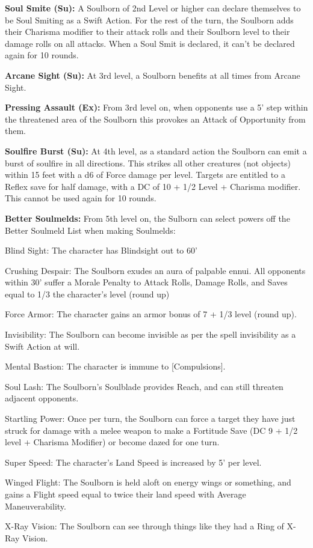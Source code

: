 \textbf{Soul Smite (Su):} A Soulborn of 2nd Level or higher can declare themselves to be Soul Smiting as a Swift Action. For the rest of the turn, the Soulborn adds their Charisma modifier to their attack rolls and their Soulborn level to their damage rolls on all attacks. When a Soul Smit is declared, it can't be declared again for 10 rounds.

\textbf{Arcane Sight (Su):} At 3rd level, a Soulborn benefits at all times from Arcane Sight.

\textbf{Pressing Assault (Ex):} From 3rd level on, when opponents use a 5' step within the threatened area of the Soulborn this provokes an Attack of Opportunity from them.

\textbf{Soulfire Burst (Su):} At 4th level, as a standard action the Soulborn can emit a burst of soulfire in all directions. This strikes all other creatures (not objects) within 15 feet with a d6 of Force damage per level. Targets are entitled to a Reflex save for half damage, with a DC of 10 + 1/2 Level + Charisma modifier. This cannot be used again for 10 rounds.

\textbf{Better Soulmelds:} From 5th level on, the Sulborn can select powers off the Better Soulmeld List when making Soulmelds:
\begin{description*}
\item[Blind Sight:] The character has Blindsight out to 60'
\item[Crushing Despair:] The Soulborn exudes an aura of palpable ennui. All opponents within 30' suffer a Morale Penalty to Attack Rolls, Damage Rolls, and Saves equal to 1/3 the character's level (round up)
\item[Force Armor:] The character gains an armor bonus of 7 + 1/3 level (round up).
\item[Invisibility:] The Soulborn can become invisible as per the spell invisibility as a Swift Action at will.
\item[Mental Bastion:] The character is immune to [Compulsions].
\item[Soul Lash:] The Soulborn's Soulblade provides Reach, and can still threaten adjacent opponents.
\item[Startling Power:] Once per turn, the Soulborn can force a target they have just struck for damage with a melee weapon to make a Fortitude Save (DC 9 + 1/2 level + Charisma Modifier) or become dazed for one turn.
\item[Super Speed:] The character's Land Speed is increased by 5' per level.
\item[Winged Flight:] The Soulborn is held aloft on energy wings or something, and gains a Flight speed equal to twice their land speed with Average Maneuverability.
\item[X-Ray Vision:] The Soulborn can see through things like they had a Ring of X-Ray Vision.
\end{description*}

